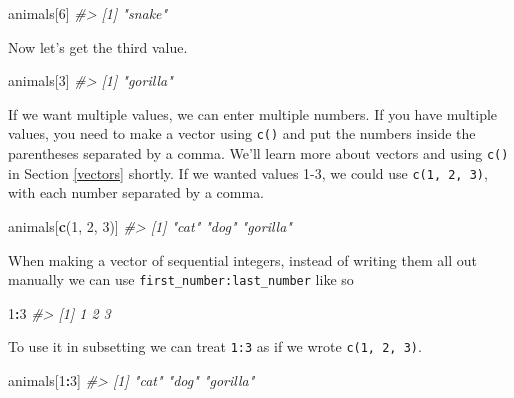 \documentclass[
  12pt,
]{book}
\newenvironment{Shaded}{\begin{snugshade}}{\end{snugshade}}
\newcommand{\CommentTok}[1]{\textcolor[rgb]{0.37,0.37,0.37}{\textit{#1}}}
\newcommand{\DecValTok}[1]{\textcolor[rgb]{0.06,0.06,0.06}{#1}}
\newcommand{\KeywordTok}[1]{\textcolor[rgb]{0.27,0.27,0.27}{\textbf{#1}}}
\newcommand{\NormalTok}[1]{#1}
\newcommand{\OperatorTok}[1]{\textcolor[rgb]{0.43,0.43,0.43}{\textbf{#1}}}
\begin{document}
\begin{Shaded}
\begin{Highlighting}[]
\NormalTok{animals[}\DecValTok{6}\NormalTok{]}
\CommentTok{\#\textgreater{} [1] "snake"}
\end{Highlighting}
\end{Shaded}

Now let's get the third value.

\begin{Shaded}
\begin{Highlighting}[]
\NormalTok{animals[}\DecValTok{3}\NormalTok{]}
\CommentTok{\#\textgreater{} [1] "gorilla"}
\end{Highlighting}
\end{Shaded}

If we want multiple values, we can enter multiple numbers. If you have multiple values, you need to make a vector using \texttt{c()} and put the numbers inside the parentheses separated by a comma. We'll learn more about vectors and using \texttt{c()} in Section \ref{vectors} shortly. If we wanted values 1-3, we could use \texttt{c(1,\ 2,\ 3)}, with each number separated by a comma.

\begin{Shaded}
\begin{Highlighting}[]
\NormalTok{animals[}\KeywordTok{c}\NormalTok{(}\DecValTok{1}\NormalTok{, }\DecValTok{2}\NormalTok{, }\DecValTok{3}\NormalTok{)]}
\CommentTok{\#\textgreater{} [1] "cat"     "dog"     "gorilla"}
\end{Highlighting}
\end{Shaded}

When making a vector of sequential integers, instead of writing them all out manually we can use \texttt{first\_number:last\_number} like so

\begin{Shaded}
\begin{Highlighting}[]
\DecValTok{1}\OperatorTok{:}\DecValTok{3}
\CommentTok{\#\textgreater{} [1] 1 2 3}
\end{Highlighting}
\end{Shaded}

To use it in subsetting we can treat \texttt{1:3} as if we wrote \texttt{c(1,\ 2,\ 3)}.

\begin{Shaded}
\begin{Highlighting}[]
\NormalTok{animals[}\DecValTok{1}\OperatorTok{:}\DecValTok{3}\NormalTok{]}
\CommentTok{\#\textgreater{} [1] "cat"     "dog"     "gorilla"}
\end{Highlighting}
\end{Shaded}
\end{document}
